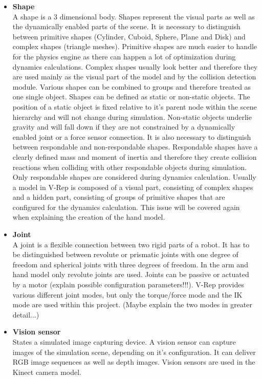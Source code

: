 \begin{itemize}
\item \textbf{Shape} \\
A shape is a 3 dimensional body. Shapes represent the visual parts as well as the dynamically enabled parts of the scene. It is necessary to distinguish between primitive shapes (Cylinder, Cuboid, Sphere, Plane and Disk) and complex shapes (triangle meshes). Primitive shapes are much easier to handle for the physics engine as there can happen a lot of optimization during dynamics calculations. Complex shapes usually look better and therefore they are used mainly as the visual part of the model and by the collision detection module. Various shapes can be combined to groups and therefore treated as one single object. Shapes can be defined as static or non-static objects. The position of a static object is fixed relative to it's parent node within the scene hierarchy and will not change during simulation. Non-static objects underlie gravity and will fall down if they are not constrained by a dynamically enabled joint or a force sensor connection. It is also necessary to distinguish between respondable and non-respondable shapes. Respondable shapes have a clearly defined mass and moment of inertia and therefore they create collision reactions when colliding with other respondable objects during simulation. Only respondable shapes are considered during dynamics calculation. Usually a model in V-Rep is composed of a visual part, consisting of complex shapes and a hidden part, consisting of groups of primitive shapes that are configured for the dynamics calculation. This issue will be covered again when explaining the creation of the hand model.

\item \textbf{Joint} \\
A joint is a flexible connection between two rigid parts of a robot. It has to be distinguished between revolute or prismatic joints with one degree of freedom and spherical joints with three degrees of freedom. In the arm and hand model only revolute joints are used. Joints can be passive or actuated by a motor (explain possible configuration parameters!!!). V-Rep provides various different joint modes, but only the torque/force mode and the IK mode are used within this project. (Maybe explain the two modes in greater detail...)

\item \textbf{Vision sensor} \\
States a simulated image capturing device. A vision sensor can capture images of the simulation scene, depending on it's configuration. It can deliver RGB image sequences as well as depth images. Vision sensors are used in the Kinect camera model.


\end{itemize}
